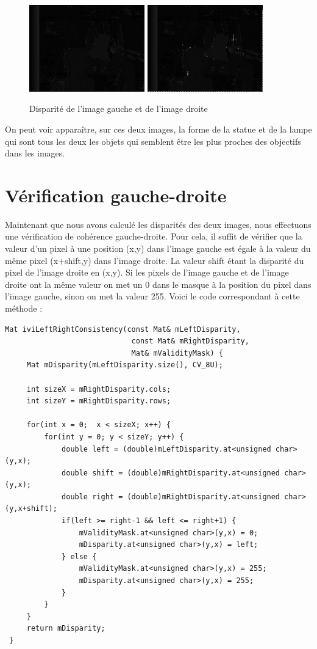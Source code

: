 \documentclass[a4paper,10pt]{article}
\begin{document}
\begin{figure}[!h]
 \centering
 \includegraphics[width=5cm]{leftDisparity.png}
 \includegraphics[width=5cm]{rightDisparity.png}
 \caption{Disparité de l'image gauche et de l'image droite}
\end{figure}
On peut voir apparaître, sur ces deux images, la forme de la statue et de la lampe qui sont
tous les deux les objets qui semblent être les plus proches des objectifs dans les images.

\section{Vérification gauche-droite}
Maintenant que nous avons calculé les disparités des deux images, nous effectuons une vérification
de cohérence gauche-droite. Pour cela, il suffit de vérifier que la valeur d'un pixel à une position (x,y)
dans l'image gauche est égale à la valeur du même pixel (x+shift,y) dans l'image droite. La valeur
shift étant la disparité du pixel de l'image droite en (x,y). Si les pixels de l'image gauche et de 
l'image droite ont la même valeur on met un 0 dans le masque à la position du pixel dans l'image gauche,
sinon on met la valeur 255. Voici le code correspondant à cette méthode :
\begin{lstlisting}[caption=Vérification de cohérence gauche-droite]
Mat iviLeftRightConsistency(const Mat& mLeftDisparity,
                             const Mat& mRightDisparity,
                             Mat& mValidityMask) {
     Mat mDisparity(mLeftDisparity.size(), CV_8U);
 
     int sizeX = mRightDisparity.cols;
     int sizeY = mRightDisparity.rows;
 
     for(int x = 0;  x < sizeX; x++) {
         for(int y = 0; y < sizeY; y++) {
             double left = (double)mLeftDisparity.at<unsigned char>(y,x);
             double shift = (double)mRightDisparity.at<unsigned char>(y,x);
             double right = (double)mRightDisparity.at<unsigned char>(y,x+shift);
             if(left >= right-1 && left <= right+1) {
                 mValidityMask.at<unsigned char>(y,x) = 0;
                 mDisparity.at<unsigned char>(y,x) = left;
             } else {
                 mValidityMask.at<unsigned char>(y,x) = 255;
                 mDisparity.at<unsigned char>(y,x) = 255;
             }
         }
     }
     return mDisparity;
 }
\end{lstlisting}
\end{document}
